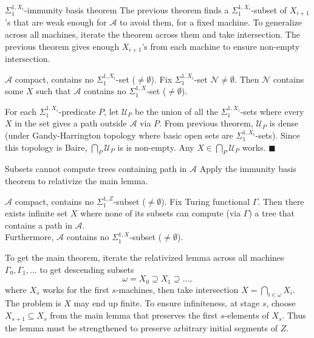 \begin{frame}{$\Sigma_1^{1,X_i}$-immunity basis theorem}
  The previous theorem finds a $\Sigma_1^{1,X_i}$-subset of $X_{i+1}$'s
  that are weak enough for $\mathcal{A}$ to avoid them, for a fixed
  machine. To generalize across all machines, iterate the theorem across
  them and take intersection. The previous theorem gives enough
  $X_{i+1}$'s from each machine to ensure non-empty intersection.

  \vspace{1em}
  \begin{immunity*}
    $\mathcal{A}$ compact, contains no $\Sigma_1^{1,X_i}$-set
    ($\neq\emptyset$). Fix $\Sigma_1^{1,X_i}$-set
    $\mathcal{N}\neq\emptyset$. Then $\mathcal{N}$ contains some $X$ such
    that $\mathcal{A}$ contains no $\Sigma_1^{1,X}$-set ($\neq\emptyset$).
  \end{immunity*}

  \vspace{1em}
  For each $\Sigma_1^{1,X_i}$-predicate $P$, let $\mathcal{U}_P$ be the
  union of all the $\Sigma_1^{1,X_i}$-sets where every $X$ in the set gives
  a path outside $\mathcal{A}$ via $P$. From previous theorem,
  $\mathcal{U}_P$ is dense (under Gandy-Harrington topology where basic
  open sets are $\Sigma_1^{1,X_i}$-sets). Since this topology is Baire,
  $\bigcap_P\mathcal{U}_P$ is is non-empty. Any
  $X\in\bigcap_P\mathcal{U}_P$ works. $\blacksquare$
\end{frame}

\begin{frame}{Subsets cannot compute trees containing path in $\mathcal{A}$}
  Apply the immunity basis theorem to relativize the main lemma.
  \begin{main-lemma*}[Relativized]
    $\mathcal{A}$ compact, contains no $\Sigma_1^{1,Z}$-subset
    ($\neq\emptyset$). Fix Turing functional $\Gamma$. Then there exists
    infinite set $X$ where none of its subsets can compute (via $\Gamma$) a
    tree that contains a path in $\mathcal{A}$.\\
    \vspace{0.5em}
    Furthermore, $\mathcal{A}$ contains no $\Sigma_1^{1,X}$-subset
    ($\neq\emptyset$).
  \end{main-lemma*}

  To get the main theorem, iterate the relativized lemma across all
  machines $\Gamma_0,\Gamma_1,\ldots$ to get descending subsets
  \[\omega=X_0\supseteq X_1\supseteq\ldots,\]
  where $X_s$ works for the first $s$-machines, then take intersection
  $X=\bigcap_{i\in\omega} X_i$. The problem is $X$ may end up finite. To
  ensure infiniteness, at stage $s$, choose $X_{s+1}\subseteq X_s$ from the
  main lemma that preserves the first $s$-elements of $X_s$. Thus the lemma
  must be strengthened to preserve arbitrary initial segments of $Z$.
\end{frame}

